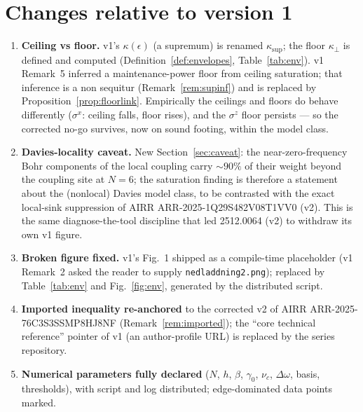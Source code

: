 \documentclass[11pt,a4paper]{article}
\theoremstyle{plain}
\theoremstyle{definition}
\theoremstyle{remark}
\newcommand{\eps}{\epsilon}
\newcommand{\ksup}{\kappa_{\sup}}
\newcommand{\kfl}{\kappa_{\perp}}
\begin{document}
\appendix

\section{Changes relative to version 1}

\begin{enumerate}
\item \textbf{Ceiling vs floor.} v1's $\kappa(\eps)$ (a supremum) is renamed
$\ksup$; the floor $\kfl$ is defined and computed
(Definition~\ref{def:envelopes}, Table~\ref{tab:env}). v1 Remark~5 inferred a
maintenance-power floor from ceiling saturation; that inference is a non
sequitur (Remark~\ref{rem:supinf}) and is replaced by
Proposition~\ref{prop:floorlink}. Empirically the ceilings and floors do
behave differently ($\sigma^x$: ceiling falls, floor rises), and the
$\sigma^z$ floor persists --- so the corrected no-go survives, now on sound
footing, within the model class.
\item \textbf{Davies-locality caveat.} New Section~\ref{sec:caveat}: the
near-zero-frequency Bohr components of the local coupling carry $\sim 90\%$
of their weight beyond the coupling site at $N=6$; the saturation finding is
therefore a statement about the (nonlocal) Davies model class, to be
contrasted with the exact local-sink suppression of AIRR ARR-2025-1Q29S482V08T1VV0 (v2).
This is the same diagnose-the-tool discipline that led 2512.0064 (v2) to
withdraw its own v1 figure.
\item \textbf{Broken figure fixed.} v1's Fig.~1 shipped as a compile-time
placeholder (v1 Remark~2 asked the reader to supply
\texttt{nedladdning2.png}); replaced by Table~\ref{tab:env} and
Fig.~\ref{fig:env}, generated by the distributed script.
\item \textbf{Imported inequality re-anchored} to the corrected v2 of
AIRR ARR-2025-76C3S3SSMP8HJ8NF (Remark~\ref{rem:imported}); the ``core technical
reference'' pointer of v1 (an author-profile URL) is replaced by the series
repository.
\item \textbf{Numerical parameters fully declared} ($N$, $h$, $\beta$,
$\gamma_0$, $\nu_c$, $\Delta\omega$, basis, thresholds), with script and log
distributed; edge-dominated data points marked.
\end{enumerate}
\end{document}
